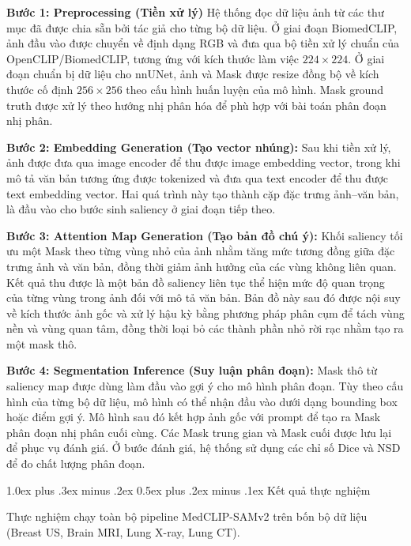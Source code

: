 \documentclass[conference]{IEEEtran}
\makeatletter
\def\section{\@startsection{section}{1}{\z@}%
  {1.0ex plus .3ex minus .2ex}%
  {0.5ex plus .2ex minus .1ex}%
  {\reset@font\normalsize\bfseries\centering}}%
\makeatother
\begin{document}
\textbf{Bước 1: Preprocessing (Tiền xử lý)} Hệ thống đọc dữ liệu ảnh từ các thư mục đã được chia sẵn bởi tác giả cho từng bộ dữ liệu. Ở giai đoạn BiomedCLIP, ảnh đầu vào được chuyển về định dạng RGB và đưa qua bộ tiền xử lý chuẩn của OpenCLIP/BiomedCLIP, tương ứng với kích thước làm việc $224 \times 224$. Ở giai đoạn chuẩn bị dữ liệu cho nnUNet, ảnh và Mask được resize đồng bộ về kích thước cố định $256 \times 256$ theo cấu hình huấn luyện của mô hình. Mask ground truth được xử lý theo hướng nhị phân hóa để phù hợp với bài toán phân đoạn nhị phân.

\textbf{Bước 2: Embedding Generation (Tạo vector nhúng):} Sau khi tiền xử lý, ảnh được đưa qua image encoder để thu được image embedding vector, trong khi mô tả văn bản tương ứng được tokenized và đưa qua text encoder để thu được text embedding vector. Hai quá trình này tạo thành cặp đặc trưng ảnh--văn bản, là đầu vào cho bước sinh saliency ở giai đoạn tiếp theo.

\textbf{Bước 3: Attention Map Generation (Tạo bản đồ chú ý):} Khối saliency tối ưu một Mask theo từng vùng nhỏ của ảnh nhằm tăng mức tương đồng giữa đặc trưng ảnh và văn bản, đồng thời giảm ảnh hưởng của các vùng không liên quan. Kết quả thu được là một bản đồ saliency liên tục thể hiện mức độ quan trọng của từng vùng trong ảnh đối với mô tả văn bản. Bản đồ này sau đó được nội suy về kích thước ảnh gốc và xử lý hậu kỳ bằng phương pháp phân cụm để tách vùng nền và vùng quan tâm, đồng thời loại bỏ các thành phần nhỏ rời rạc nhằm tạo ra một mask thô.

\textbf{Bước 4: Segmentation Inference (Suy luận phân đoạn):} Mask thô từ saliency map được dùng làm đầu vào gợi ý cho mô hình phân đoạn. Tùy theo cấu hình của từng bộ dữ liệu, mô hình có thể nhận đầu vào dưới dạng bounding box hoặc điểm gợi ý. Mô hình sau đó kết hợp ảnh gốc với prompt để tạo ra Mask phân đoạn nhị phân cuối cùng. Các Mask trung gian và Mask cuối được lưu lại để phục vụ đánh giá. Ở bước đánh giá, hệ thống sử dụng các chỉ số Dice và NSD để đo chất lượng phân đoạn.

\section{Kết quả thực nghiệm}
\label{sec:ketqua}

Thực nghiệm chạy toàn bộ pipeline MedCLIP-SAMv2 trên bốn bộ dữ liệu (Breast US, Brain MRI, Lung X-ray, Lung CT).
\end{document}
